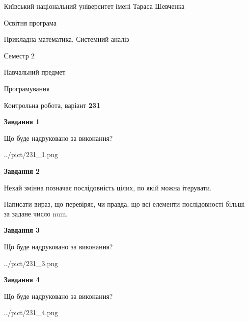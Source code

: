 \documentclass[12pt, ukrainian]{article}
\begin{document}
{{\begin {small}\par
{ \center  Київський національний університет імені Тараса Шевченка \par}
{\parbox {5 cm}{Освітня програма \hfill}{\parbox {8 cm}{Прикладна математика, Системний аналіз \hfill}}\parbox {5 cm}{\hfill Семестр 2}}\par
{\parbox {5 cm} {Навчальний предмет \hfill}\parbox {7 cm}{Програмування \hfill}\parbox {6cm}{\hfill}\par}\vspace{-7pt} \end{small}}{\center Контрольна робота, варіант  \No \textbf
{ 231 }\par}}
{
\begin {large}
{\begin {center}\textbf{Завдання 1}\end {center}}\par
Що буде надруковано за виконання?\par\par
\begin{center}
	{../pict/231_1.png}
\end{center}
\newpage

{\begin {center}\textbf{Завдання 2}\end {center}}\par
Нехай змінна  позначає послідовність цілих, по якій можна ітерувати.

Написати вираз, що перевіряє, чи правда, що всі елементи послідовності більші за задане число num.\par
\newpage

{\begin {center}\textbf{Завдання 3}\end {center}}\par
Що буде надруковано за виконання?
\begin{center}
	{../pict/231_3.png}
\end{center}
\newpage

{\begin {center}\textbf{Завдання 4}\end {center}}\par
Що буде надруковано за виконання?\par
\begin{center}
	{../pict/231_4.png}
\end{center}
\newpage


\end{large}}
\end{document}
